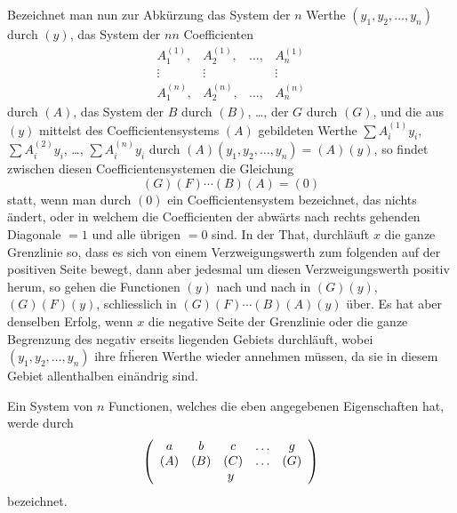 \documentclass[12pt,a4paper]{article}
\begin{document}
Bezeichnet man nun zur Abk\"urzung das System der $n$ Werthe $(y_1, y_2, \ldots, y_n)$ durch $(y)$, das System der $nn$ Coefficienten
\[
\begin{array}{cccc}
A_1^{(1)}, & A_2^{(1)}, & \ldots, & A_n^{(1)} \\
\vdots & \vdots & & \vdots \\
A_1^{(n)}, & A_2^{(n)}, & \ldots, & A_n^{(n)}
\end{array}
\]
durch $(A)$, das System der $B$ durch $(B)$, \ldots, der $G$ durch $(G)$, und die aus $(y)$ mittelst des Coefficientensystems $(A)$ gebildeten Werthe $\sum A_i^{(1)}y_i$, $\sum A_i^{(2)}y_i$, \ldots, $\sum A_i^{(n)}y_i$ durch $(A)(y_1, y_2, \ldots, y_n) = (A)(y)$, so findet zwischen diesen Coefficientensystemen die Gleichung
\begin{equation}
(G)(F)\cdots(B)(A) = (0)
\end{equation}
statt, wenn man durch $(0)$ ein Coefficientensystem bezeichnet, das nichts \"andert, oder in welchem die Coefficienten der abw\"arts nach rechts gehenden Diagonale $=1$ und alle \"ubrigen $=0$ sind. In der That, durchl\"auft $x$ die ganze Grenzlinie so, dass es sich von einem Verzweigungswerth zum folgenden auf der positiven Seite bewegt, dann aber jedesmal um diesen Verzweigungswerth positiv herum, so gehen die Functionen $(y)$ nach und nach in $(G)(y)$, $(G)(F)(y)$, schliesslich in $(G)(F)\cdots(B)(A)(y)$ \"uber. Es hat aber denselben Erfolg, wenn $x$ die negative Seite der Grenzlinie oder die ganze Begrenzung des negativ erseits liegenden Gebiets durchl\"auft, wobei $(y_1, y_2, \ldots, y_n)$ ihre fr\"heren Werthe wieder annehmen m\"ussen, da sie in diesem Gebiet allenthalben ein\"andrig sind.

Ein System von $n$ Functionen, welches die eben angegebenen Eigenschaften hat, werde durch
\[
\left(\begin{array}{ccccc}
a & b & c & \ldots & g \\
(A) & (B) & (C) & \ldots & (G)\\
\multicolumn{5}{c}{y}
\end{array}\right)
\]
bezeichnet.
\end{document}
